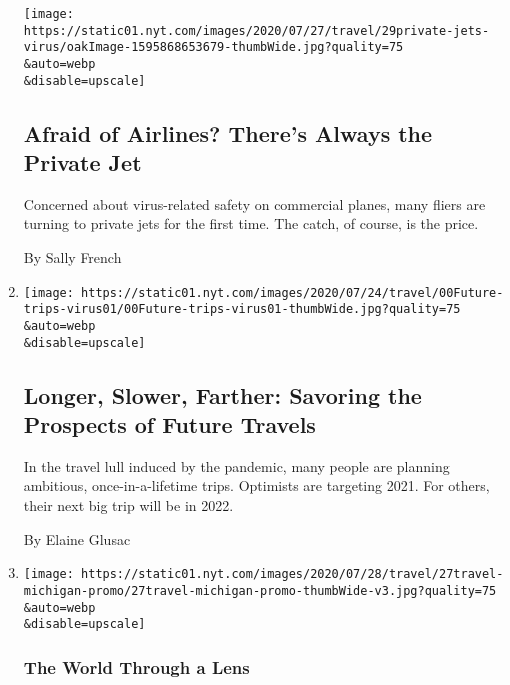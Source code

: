 \begin{enumerate}
  \texttt{[image: https://static01.nyt.com/images/2020/07/27/travel/29private-jets-virus/oakImage-1595868653679-thumbWide.jpg?quality=75\\\&auto=webp\\\&disable=upscale]}

  \hypertarget{afraid-of-airlines-theres-always-the-private-jet}{%
  \subsection{Afraid of Airlines? There's Always the Private
  Jet}\label{afraid-of-airlines-theres-always-the-private-jet}}

  Concerned about virus-related safety on commercial planes, many fliers
  are turning to private jets for the first time. The catch, of course,
  is the price.

  By Sally French
\item
  \href{/2020/07/28/travel/future-travel-bucket-list-coronavirus.html}{}

  \texttt{[image: https://static01.nyt.com/images/2020/07/24/travel/00Future-trips-virus01/00Future-trips-virus01-thumbWide.jpg?quality=75\\\&auto=webp\\\&disable=upscale]}

  \hypertarget{longer-slower-farther-savoring-the-prospects-of-future-travels}{%
  \subsection{Longer, Slower, Farther: Savoring the Prospects of Future
  Travels}\label{longer-slower-farther-savoring-the-prospects-of-future-travels}}

  In the travel lull induced by the pandemic, many people are planning
  ambitious, once-in-a-lifetime trips. Optimists are targeting 2021. For
  others, their next big trip will be in 2022.

  By Elaine Glusac
\item
  \href{/2020/07/27/travel/moose-michigan-isle-royale.html}{}

  \texttt{[image: https://static01.nyt.com/images/2020/07/28/travel/27travel-michigan-promo/27travel-michigan-promo-thumbWide-v3.jpg?quality=75\\\&auto=webp\\\&disable=upscale]}

  \hypertarget{the-world-through-a-lens-1}{%
  \subsubsection{The World Through a
  Lens}\label{the-world-through-a-lens-1}}

  \hypertarget{on-the-lookout-for-moose-on-michigans-isle-royale}{%
}
\end{enumerate}
